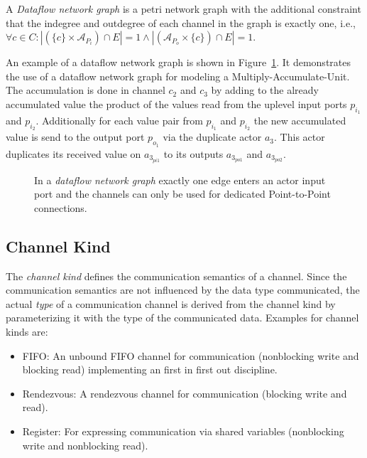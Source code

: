\begin{definition}\label{dataflow-network-graph}
  A \emph{Dataflow network graph} is a petri network graph with the additional constraint
  that the indegree and outdegree of each channel in the graph is exactly one, i.e.,
  $\forall{c \in C}: |(\{c\} \times \mathcal{A}_{P_{i}}) \cap E| = 1 \wedge
                    |(\mathcal{A}_{P_{o}} \times \{c\}) \cap E| = 1$.
\end{definition}

  An example of a dataflow network graph is shown in Figure~\ref{ng-dataflow}.
  It demonstrates the use of a dataflow network graph for modeling
  a Multiply-Accumulate-Unit. The accumulation is done in channel $c_2$ and $c_3$
  by adding to the already accumulated value the product of
  the values read from the uplevel input ports $p_{i_1}$ and $p_{i_2}$.
  Additionally for each value pair from $p_{i_1}$ and $p_{i_2}$ the
  new accumulated value is send to the output port $p_{o_1}$ via
  the duplicate actor $a_3$. This actor duplicates its received
  value on $a_{3_{pi1}}$ to its outputs $a_{3_{po1}}$ and $a_{3_{po2}}$.

\begin{figure}
\centering

\caption{\label{ng-dataflow} In a \emph{dataflow network graph} exactly
  one edge enters an actor input port and
  the channels can only be used for dedicated
  Point-to-Point connections.}
\end{figure}

\subsection{Channel Kind}\label{channel-kind}

The \emph{channel kind} defines the communication semantics of a channel.
Since the communication semantics are not influenced by the
data type communicated, the actual \emph{type} of a communication
channel is derived from the channel kind by parameterizing it with
the type of the communicated data. Examples for channel kinds are:

\begin{itemize}
\item \label{channel-kind-fifo} FIFO:
  An unbound FIFO channel for communication
  (nonblocking write and blocking read) implementing
  an first in first out discipline.

\item \label{channel-kind-rendezvous} Rendezvous:
  A rendezvous channel for communication %
  (blocking write and read).

\item \label{channel-kind-register} Register:
  For expressing communication via shared variables
  (nonblocking write and nonblocking read).
\end{itemize}

